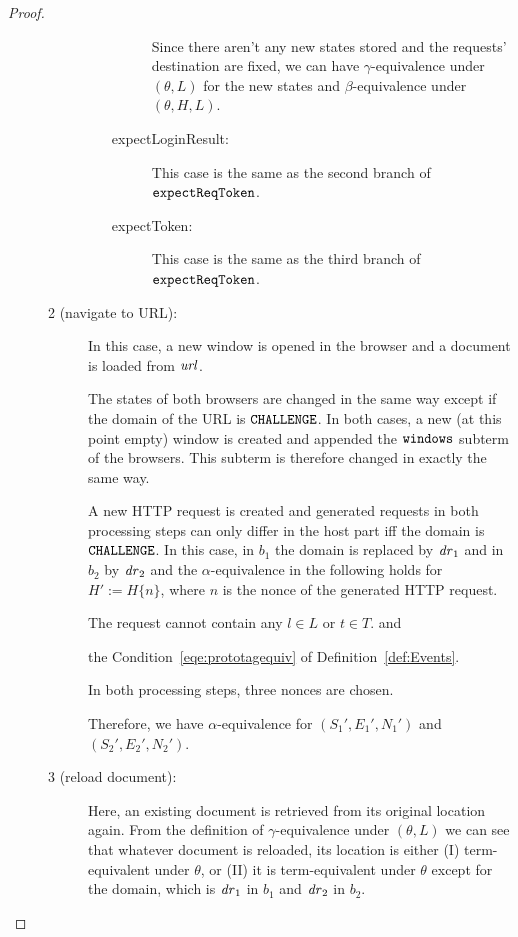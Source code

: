 \begin{proof}
\begin{description}
\begin{description}
\begin{enumerate}
\begin{description}
              Since there aren't any new states stored and the
              requests' destination are fixed, we can have 
              $\gamma$-equivalence under $(\theta,L)$ for the 
              new states and $\beta$-equivalence under 
              $(\theta,H,L)$. 
              \item[expectLoginResult:] This case is the same as 
                the second branch of $\mathtt{expectReqToken}$.
              \item[expectToken:] This case is the same as 
                the third branch of $\mathtt{expectReqToken}$.
            \end{description}
          \end{enumerate}
        \item[2 (navigate to URL):] 
        In this case, a new window is opened
        in the browser and a document is loaded from $\mathit{url}$.
  
        The states of both browsers are changed in the same way except
        if the domain of the URL is $\mathtt{CHALLENGE}$. In both cases, a
        new (at this point empty) window is created and appended the
        $\mathtt{windows}$ subterm of the browsers. This subterm is
        therefore changed in exactly the same way.
  
        A new HTTP request is created and generated requests in 
        both processing
        steps can only differ in the host part iff the domain is
        $\mathtt{CHALLENGE}$. In this case, in $b_1$ the domain is replaced
        by $\mathit{dr}_1$ and in $b_2$ by $\mathit{dr}_2$ and the
        $\alpha$-equivalence in the following holds for $H' := H \{n\}$,
        where $n$ is the nonce of the generated HTTP request.
  
        The request cannot contain any $l \in L$ or $t \in T$.
        and 
        
        the Condition~\ref{eqe:prototagequiv} of 
        Definition~\ref{def:Events}.
  
        In both processing steps, three nonces are chosen.
  
        Therefore, we have $\alpha$-equivalence for $(S_1',E_1',N_1')$
        and $(S_2',E_2',N_2')$.
        \item[3 (reload document):]
        Here, an existing document is
        retrieved from its original location again. From the definition
        of $\gamma$-equivalence under $(\theta,L)$ we can see that
        whatever document is reloaded, its location is either (I)
        term-equivalent under $\theta$, or (II) it is term-equivalent
        under $\theta$ except for the domain, which is $\mathit{dr}_1$ in
        $b_1$ and $\mathit{dr}_2$ in $b_2$. 
  

\end{description}
\end{description}
\end{proof}
